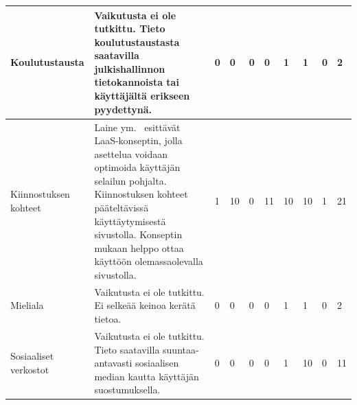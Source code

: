 \documentclass[finnish, 12pt, a4paper, elec, utf8, a-1b, online]{aaltothesis}
\begin{document}
{\begin{longtable}{p{2.5cm}|p{6cm}|p{0.5cm}p{0.5cm}p{0.5cm}|p{0.5cm}|p{0.5cm}p{0.5cm}p{0.5cm}|p{0.5cm}|}
    \midrule
    Koulutustausta                          & Vaikutusta ei ole tutkittu. Tieto koulutustaustasta saatavilla julkishallinnon tietokannoista tai käyttäjältä erikseen pyydettynä.                                                                                                                                                                                                                                      & 0                                          & 0                                   & 0                                      & 0                            & 1                                               & 1                                         & 0                                         & 2                            \\
    \midrule
    Kiinnostuksen kohteet                   & Laine ym.~\cite{laine2020_laas} esittävät LaaS-konseptin, jolla asettelua voidaan optimoida käyttäjän selailun pohjalta. Kiinnostuksen kohteet pääteltävissä käyttäytymisestä sivustolla. Konseptin mukaan helppo ottaa käyttöön olemassaolevalla sivustolla.                                                                                                           & 1                                          & 10                                  & 0                                      & 11                           & 10                                              & 10                                        & 1                                         & 21                           \\
    \midrule
    Mieliala                                & Vaikutusta ei ole tutkittu. Ei selkeää keinoa kerätä tietoa.                                                                                                                                                                                                                                                                                                            & 0                                          & 0                                   & 0                                      & 0                            & 1                                               & 1                                         & 0                                         & 2                            \\
    \midrule
    Sosiaaliset verkostot                   & Vaikutusta ei ole tutkittu. Tieto saatavilla suuntaa-antavasti sosiaalisen median kautta käyttäjän suostumuksella.                                                                                                                                                                                                                                                      & 0                                          & 0                                   & 0                                      & 0                            & 1                                               & 10                                        & 0                                         & 11                           \\

\end{longtable}}
\end{document}
